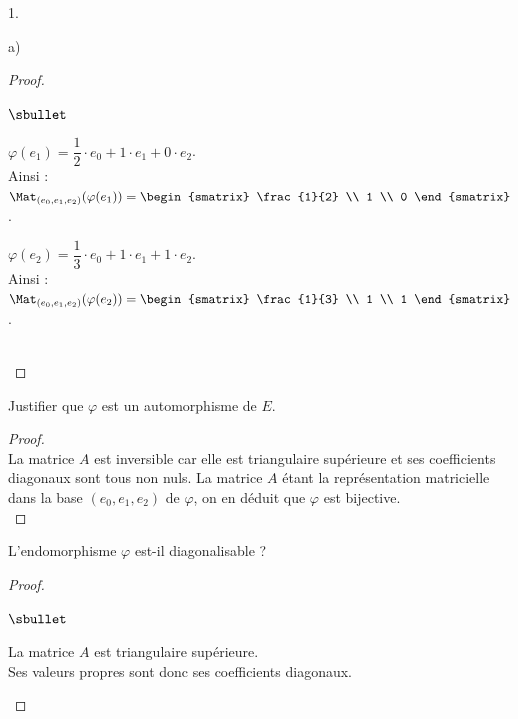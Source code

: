 \documentclass[11pt]{article}%
\begin{document}
\begin{noliste}{1.}
\begin{noliste}{a)}
\begin{proof}
\begin{noliste}{$\sbullet$}
      \item $\varphi(e_1) = \dfrac{1}{2} \cdot e_0 + 1 \cdot e_1 + 0
        \cdot e_2$.\\ 
        Ainsi : $\Mat_{(e_0, e_1, e_2)}(\varphi(e_1)) =
        \begin{smatrix}
          \frac{1}{2} \\
          1 \\
          0
        \end{smatrix}
        $.

      \item $\varphi(e_2) = \dfrac{1}{3} \cdot e_0 + 1 \cdot e_1 + 1
        \cdot e_2$.\\ 
        Ainsi : $\Mat_{(e_0, e_1, e_2)}(\varphi(e_2)) =
        \begin{smatrix}
          \frac{1}{3} \\
          1 \\
          1
        \end{smatrix}
        $.        
      \end{noliste}
      ~\\[-1cm]
    \end{proof}

  \item Justifier que $\varphi$ est un automorphisme de $E$.

    \begin{proof}~\\
      La matrice $A$ est inversible car elle est triangulaire
      supérieure et ses coefficients diagonaux sont tous non
      nuls. La matrice $A$ étant la représentation matricielle dans la
      base $(e_0, e_1, e_2)$ de $\varphi$, on en déduit que $\varphi$
      est bijective.%
      ~\\[-1.2cm]
    \end{proof}

  \item L'endomorphisme $\varphi$ est-il diagonalisable ?

    \begin{proof}~%
      \begin{noliste}{$\sbullet$}
      \item La matrice $A$ est triangulaire supérieure. \\
        Ses valeurs propres sont donc ses coefficients diagonaux.%


\end{noliste}
\end{proof}
\end{noliste}
\end{noliste}
\end{document}

